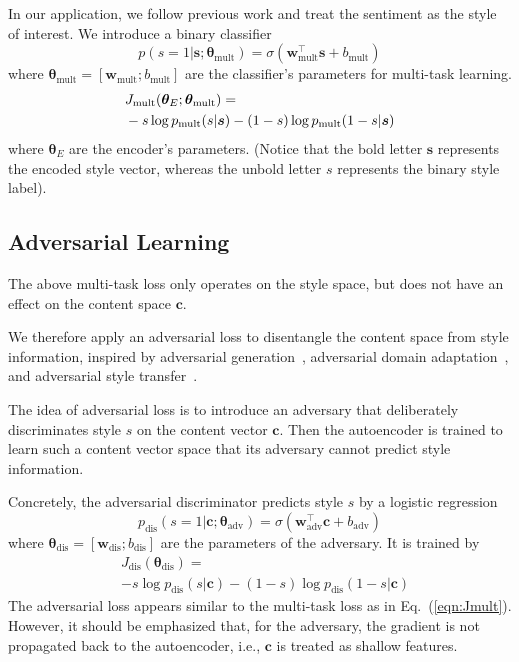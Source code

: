 \documentclass[11pt,a4paper]{article}
\begin{document}
In our application, we follow previous work \cite{hu2017toward,shen2017style,fu2017style} and treat the sentiment as the style of interest. We introduce a binary classifier
\begin{equation}
	p(s=1|\bm s;\bm\theta_\text{mult})=\sigma(\bm w_\text{mult}^\top \bm s + b_\text{mult})
\end{equation}
where $\bm\theta_\text{mult}=[\bm w_\text{mult}; b_\text{mult}]$ are the classifier's parameters for multi-task learning.
\vspace{-.3cm}
\begin{align} \label{eqn:Jmult}
	 & J_\text{mult}(\bm\theta_{E};\bm\theta_\text{mult})=                \\ \nonumber
	 & -s\log p_\text{mult}(s|\bm s) - (1-s)\log p_\text{mult}(1-s|\bm s)
	\vspace{-.3cm}
\end{align}
where $\bm\theta_E$ are the encoder's parameters. (Notice that the bold letter $\bm s$ represents the encoded style vector, whereas the unbold letter $s$ represents the binary style label).


\subsection{Adversarial Learning} \label{ss:adv}

The above multi-task loss only operates on the style space, but does not have an effect on the content space $\bm c$.

We therefore apply an adversarial loss to disentangle the content space from style information, inspired by adversarial generation~\cite{goodfellow2014generative}, adversarial domain adaptation~\cite{liu2017adversarial}, and adversarial style transfer~\cite{fu2017style}.

The idea of adversarial loss is to introduce an adversary that deliberately discriminates style $s$ on the content vector $\bm c$. Then the autoencoder is trained to learn such a content vector space that its adversary cannot predict style information.

Concretely, the adversarial discriminator predicts style $s$ by a logistic regression
\vspace{-.3cm}
\begin{equation}
	p_\text{dis}(s=1|\bm c;\bm\theta_\text{adv})=\sigma(\bm w_\text{adv}^\top \bm c + b_\text{adv})
\end{equation}
where $\bm\theta_\text{dis}=[\bm w_\text{dis}; b_\text{dis}]$ are the parameters of the adversary. It is trained by
\begin{align}
	 & J_\text{dis}(\bm\theta_\text{dis})=                            \\ \nonumber
	 & -s\log p_\text{dis}(s|\bm c)-(1-s)\log p_\text{dis}(1-s|\bm c)
\end{align}
The adversarial loss appears similar to the multi-task loss as in Eq.~(\ref{eqn:Jmult}). However, it should be emphasized that, for the adversary, the gradient is not propagated back to the autoencoder, i.e., $\bm c$ is treated as shallow features.
\end{document}
